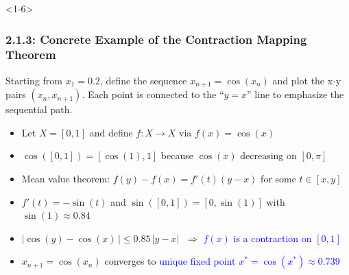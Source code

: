 \documentclass[10pt,english,aspectratio=169]{beamer}
\begin{document}
\begin{frame}

\end{frame}

\begin{frame}<1-6> \frametitle{2.1.3: Concrete Example of the Contraction Mapping Theorem}

\vspace{1mm}
\begin{minipage}{0.45\textwidth}
Starting from $x_1 = 0.2$, define the sequence $x_{n+1}= \cos(x_n)$ and plot the x-y pairs $(x_n,x_{n+1})$.  Each point is connected to the ``$y\!=\!x$'' line to emphasize the sequential path.
\end{minipage}
\begin{minipage}{0.5\textwidth}
\scalebox{0.72}{}
\end{minipage}
\vspace{0mm}

\begin{itemize}
\setlength\itemsep{1.25mm}
\item<1-> Let $X=[0,1]$ and define $f\colon X\to X$ via $f(x)=\cos(x)$

\item<2-> $\cos([0,1]) = [\cos(1),1]$ because $\cos(x)$ decreasing on $[0,\pi]$

\item<3-> Mean value theorem: $f(y)-f(x) = f'(t) (y-x)$ for some $t\in [x,y]$

\item<4-> $f'(t) = -\sin(t)$ and $\sin([0,1]) = [0,\sin(1)]$ with $\sin(1) \approx 0.84$

\item<5-> $| \cos(y) - \cos(x) \,| \leq 0.85 \, |y-x|$ $\;\Rightarrow$ \textcolor{blue}{$f(x)$ is a contraction on $[0,1]$}

\item<6-> $x_{n+1} \!= \cos(x_n)$  converges to \textcolor{blue}{unique fixed point $x^* \!= \cos(x^*) \!\approx\! 0.739$}
\end{itemize}


\end{frame}
\end{document}
